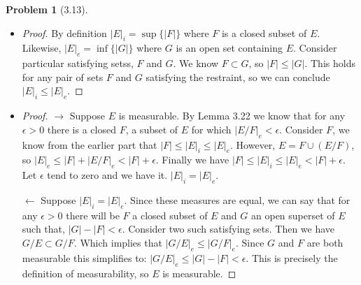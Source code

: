 \documentclass[10pt]{article}
\theoremstyle{plain}
\newtheorem{problem}{Problem}
\theoremstyle{remark}
\begin{document}
\begin{problem}[3.13]

\end{problem}
\begin{itemize}
\item \begin{proof} By definition $|E|_i = \sup \{ |F|\}$ where $F$ is a closed
      subset of $E$. Likewise, $|E|_e = \inf \{ |G|\}$ where $G$ is an open set
      containing $E$. Consider particular satisfying setss, $F$ and $G$. We know
      $F \subset G$, so $|F| \leq |G|$. This holds for any pair of sets $F$ and
      $G$ satisfying the restraint, so we can conclude $|E|_i \leq |E|_e$.
      \end{proof}

\item \begin{proof}
      $\rightarrow$ Suppose $E$ is measurable. By Lemma 3.22 we know that for
      any $\epsilon > 0$ there is a closed $F$, a subset of $E$ for which
      $|E/F|_e < \epsilon$. Consider $F$, we know from the earlier part that
      $|F| \leq |E|_i \leq |E|_e$. However, $E = F \cup (E / F)$, so $|E|_e \leq
      |F| + |E/F|_e < |F| + \epsilon$. Finally we have $|F| \leq |E|_i \leq
      |E|_e < |F| + \epsilon$. Let $\epsilon$ tend to zero and we have it.
      $|E|_i = |E|_e$.

      $\leftarrow$ Suppose $|E|_i = |E|_e$. Since these measures are equal, we
      can say that for any $\epsilon > 0$ there will be $F$ a closed subset of
      $E$ and $G$ an open superset of $E$ such that, $|G| - |F| < \epsilon$.
      Consider two such satisfying sets. Then we have $G/E \subset G/F$. Which
      implies that $|G/E|_e \leq |G/F|_e$. Since $G$ and $F$ are both measurable
      this simplifies to: $|G/E|_e \leq |G| - |F| < \epsilon$. This is
      precisely the definition of measurability, so $E$ is measurable.
      \end{proof}
\end{itemize}
\end{document}
